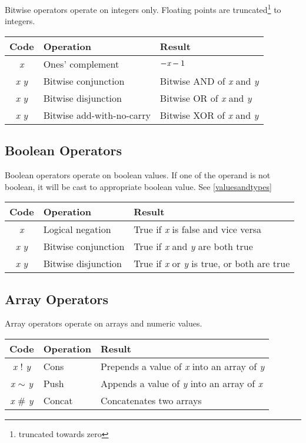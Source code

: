 Bitwise operators operate on integers only. Floating points are truncated\footnote{truncated towards zero} to integers.

\begin{tabulary}{\textwidth}{CLL}
Code & Operation & Result \\
\hline
{} \emph{x} & Ones' complement & $-\emph{x}-1$ \\
\emph{x}   \emph{y} & Bitwise conjunction & Bitwise AND of \emph{x} and \emph{y} \\
\emph{x}   \emph{y} & Bitwise disjunction & Bitwise OR of \emph{x} and \emph{y} \\
\emph{x}   \emph{y} & Bitwise add-with-no-carry & Bitwise XOR of \emph{x} and \emph{y} \\
\end{tabulary}

\subsection{Boolean Operators}

Boolean operators operate on boolean values. If one of the operand is not boolean, it will be cast to appropriate boolean value. See \ref{valuesandtypes}

\begin{tabulary}{\textwidth}{CLL}
Code & Operation & Result \\
\hline
{} \emph{x} & Logical negation & True if \emph{x} is false and vice versa \\
\emph{x}  \emph{y} & Bitwise conjunction & True if \emph{x} and \emph{y} are both true \\
\emph{x}  \emph{y} & Bitwise disjunction & True if \emph{x} or \emph{y} is true, or  both are true \\
\end{tabulary}

\subsection{Array Operators}

Array operators operate on arrays and numeric values.

\begin{tabulary}{\textwidth}{CLL}
Code & Operation & Result \\
\hline
\emph{x} $!$ \emph{y} & Cons & Prepends a value of \emph{x} into an array of \emph{y} \\
\emph{x} $\sim$ \emph{y} & Push & Appends a value of \emph{y} into an array of \emph{x} \\
\emph{x} $\#$ \emph{y} & Concat & Concatenates two arrays \\
\end{tabulary}

